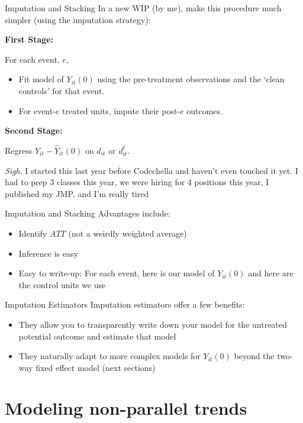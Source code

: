 \documentclass[t]{beamer}
\begin{document}
\begin{frame}{Imputation and Stacking}
  In a new WIP (by me), make this procedure much simpler (using the imputation strategy):

  \bigskip
  \textbf{First Stage:}

  For each event, $e$,
  \begin{itemize}
    \item Fit model of $Y_{it}(0)$ using the pre-treatment observations and the `clean controls' for that event.

    \item For event-$e$ treated units, impute their post-$e$ outcomes.
  \end{itemize}

  \bigskip
  \textbf{Second Stage:}

  Regress $Y_{it} - \hat{Y}_{it}(0)$ on $d_{it}$ or $d_{it}^\ell$.


  \bigskip\bigskip
  {\tiny \emph{Sigh}. I started this last year before Codechella and haven't even touched it yet. I had to prep 3 classes this year, we were hiring for 4 positions this year, I published my JMP, and I'm really tired}
\end{frame}

\begin{frame}{Imputation and Stacking}
  Advantages include:
  \begin{itemize}
    \item Identify $ATT$ (not a weirdly weighted average)
    \item Inference is easy
    \item Easy to write-up: For each event, here is our model of $Y_{it}(0)$ and here are the control units we use
  \end{itemize}
\end{frame}

\begin{frame}{Imputation Estimators}
  Imputation estimators offer a few benefits:
  \begin{itemize}
    \item They allow you to transparently write down your model for the untreated potential outcome and estimate that model
    \item They naturally adapt to more complex models for $Y_{it}(0)$ beyond the two-way fixed effect model (next sections)
  \end{itemize}
\end{frame}

\section{Modeling non-parallel trends}
\end{document}
